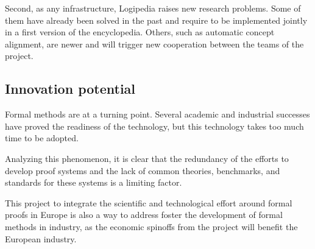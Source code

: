 Second, as any infrastructure, {\sc Logipedia} raises new research
problems. Some of them have already been solved in the past and
require to be implemented jointly in a first version of the
encyclopedia. Others, such as automatic concept alignment, are newer
and will trigger new cooperation between the teams of the project.


\subsection{Innovation potential}

Formal methods are at a turning point. Several academic and
industrial successes have proved the readiness of the technology, but
this technology takes too much time to be adopted.


Analyzing this phenomenon, it is clear that the redundancy of the
efforts to develop proof systems and the lack of common theories,
benchmarks, and standards for these systems is a limiting factor.

This project to integrate the scientific and technological effort
around formal proofs in Europe is also a way to address foster the
development of formal methods in industry, as the economic spinoffs
from the project will benefit the European industry.

